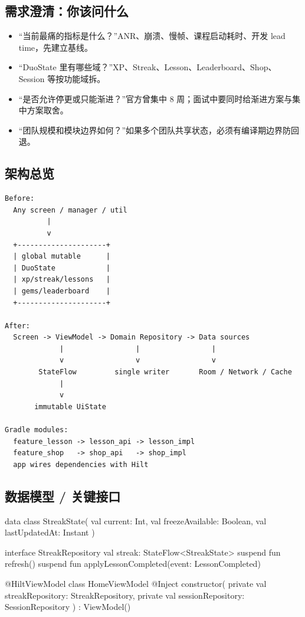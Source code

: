 \subsection{需求澄清：你该问什么}

\begin{itemize}
  \item “当前最痛的指标是什么？”ANR、崩溃、慢帧、课程启动耗时、开发 lead time，先建立基线。
  \item “DuoState 里有哪些域？”XP、Streak、Lesson、Leaderboard、Shop、Session 等按功能域拆。
  \item “是否允许停更或只能渐进？”官方曾集中 8 周；面试中要同时给渐进方案与集中方案取舍。
  \item “团队规模和模块边界如何？”如果多个团队共享状态，必须有编译期边界防回退。
\end{itemize}

\subsection{架构总览}

\begin{lstlisting}
Before:
  Any screen / manager / util
          |
          v
  +---------------------+
  | global mutable      |
  | DuoState            |
  | xp/streak/lessons   |
  | gems/leaderboard    |
  +---------------------+

After:
  Screen -> ViewModel -> Domain Repository -> Data sources
             |                 |                 |
             v                 v                 v
        StateFlow         single writer       Room / Network / Cache
             |
             v
       immutable UiState

Gradle modules:
  feature_lesson -> lesson_api -> lesson_impl
  feature_shop   -> shop_api   -> shop_impl
  app wires dependencies with Hilt
\end{lstlisting}

\subsection{数据模型 / 关键接口}

\begin{kotlin}
data class StreakState(
    val current: Int,
    val freezeAvailable: Boolean,
    val lastUpdatedAt: Instant
)

interface StreakRepository {
    val streak: StateFlow<StreakState>
    suspend fun refresh()
    suspend fun applyLessonCompleted(event: LessonCompleted)
}

@HiltViewModel
class HomeViewModel @Inject constructor(
    private val streakRepository: StreakRepository,
    private val sessionRepository: SessionRepository
) : ViewModel()
\end{kotlin}

